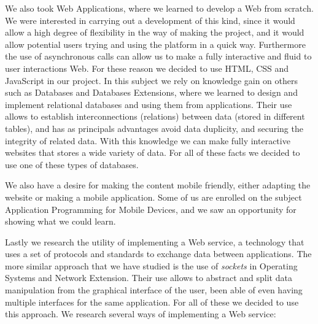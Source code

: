 We also took Web Applications, where we learned to develop a Web from scratch. We were interested in carrying out a development of this kind, since it would allow a high degree of flexibility in the way of making the project, and it would allow potential users trying and using the platform in a quick way. Furthermore the use of asynchronous calls can allow us to make a fully interactive and fluid to user interactions Web. For these reason we decided to use HTML, CSS and JavaScript in our project. In this subject we rely on knowledge gain on others such as Databases and Databases Extensions, where we learned to design and implement relational databases and using them from applications. Their use allows to establish interconnections (relations) between data (stored in different tables), and has as principals advantages avoid data duplicity, and securing the integrity of related data. With this knowledge we can make fully interactive websites that stores a wide variety of data. For all of these facts we decided to use one of these types of databases.  

We also have a desire for making the content mobile friendly, either adapting the website or making a mobile application. Some of us are enrolled on the subject Application Programming for Mobile Devices, and we saw an opportunity for showing what we could learn.  

Lastly we research the utility of implementing a Web service, a technology that uses a set of protocols and standards to exchange data between applications. The more similar approach that we have studied is the use of \emph{sockets} in Operating Systems and Network Extension. Their use allows to abstract and split data manipulation from the graphical interface of the user, been able of even having multiple interfaces for the same application. For all of these we decided to use this approach. We research several ways of implementing a Web service:

